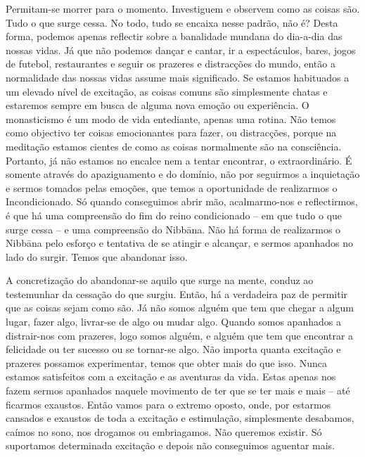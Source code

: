 Permitam-se morrer para o momento. Investiguem e observem como as coisas são.
Tudo o que surge cessa. No todo, tudo se encaixa nesse padrão, não é? Desta
forma, podemos apenas reflectir sobre a banalidade mundana do dia-a-dia das
nossas vidas. Já que não podemos dançar e cantar, ir a espectáculos, bares,
jogos de futebol, restaurantes e seguir os prazeres e distracções do mundo,
então a normalidade das nossas vidas assume mais significado. Se estamos
habituados a um elevado nível de excitação, as coisas comuns são simplesmente
chatas e estaremos sempre em busca de alguma nova emoção ou experiência. O
monasticismo é um modo de vida entediante, apenas uma rotina. Não temos como
objectivo ter coisas emocionantes para fazer, ou distracções, porque na
meditação estamos cientes de como as coisas normalmente são na consciência.
Portanto, já não estamos no encalce nem a tentar encontrar, o extraordinário. É
somente através do apaziguamento e do domínio, não por seguirmos a inquietação e
sermos tomados pelas emoções, que temos a oportunidade de realizarmos o
Incondicionado. Só quando conseguimos abrir mão, acalmarmo-nos e reflectirmos, é
que há uma compreensão do fim do reino condicionado -- em que tudo o que surge
cessa -- e uma compreensão do Nibbāna. Não há forma de realizarmos o
Nibbāna pelo esforço e tentativa de se atingir e alcançar, e sermos
apanhados no lado do surgir. Temos que abandonar isso.

A concretização do abandonar-se aquilo que surge na mente, conduz ao testemunhar
da cessação do que surgiu. Então, há a verdadeira paz de permitir que as coisas
sejam como são. Já não somos alguém que tem que chegar a algum lugar, fazer
algo, livrar-se de algo ou mudar algo. Quando somos apanhados a distrair-nos com
prazeres, logo somos alguém, e alguém que tem que encontrar a felicidade ou ter
sucesso ou se tornar-se algo. Não importa quanta excitação e prazeres possamos
experimentar, temos que obter mais do que isso. Nunca estamos satisfeitos com a
excitação e as aventuras da vida. Estas apenas nos fazem sermos apanhados
naquele movimento de ter que se ter mais e mais -- até ficarmos exaustos. Então
vamos para o extremo oposto, onde, por estarmos cansados e exaustos de toda a
excitação e estimulação, simplesmente desabamos, caímos no sono, nos drogamos ou
embriagamos. Não queremos existir. Só suportamos determinada excitação e depois
não conseguimos aguentar mais.

